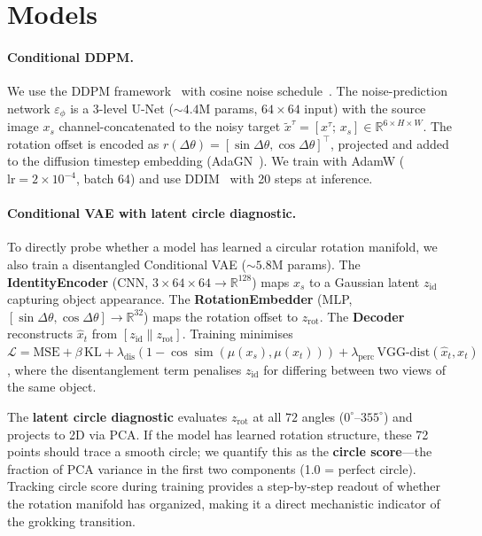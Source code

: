 \documentclass[11pt]{article}
\newcommand{\R}{\mathbb{R}}
\newcommand{\Dtheta}{\Delta\theta}
\newcommand{\eps}{\varepsilon}
\begin{document}
\section{Models}
\label{sec:models}

\paragraph{Conditional DDPM.}
We use the DDPM framework~\cite{ho2020ddpm} with cosine noise
schedule~\cite{nichol2021improved}.  The noise-prediction network $\eps_\phi$
is a 3-level U-Net (${\sim}4.4$M params, $64\times64$ input) with the source
image $x_s$ channel-concatenated to the noisy target
$\tilde{x}^\tau = [x^\tau;\, x_s] \in \R^{6\times H\times W}$.  The rotation
offset is encoded as $r(\Dtheta) = [\sin\Dtheta, \cos\Dtheta]^\top$, projected
and added to the diffusion timestep embedding (AdaGN~\cite{dhariwal2021beats}).
We train with AdamW ($\mathrm{lr}=2\!\times\!10^{-4}$, batch 64) and
use DDIM~\cite{song2021ddim} with 20 steps at inference.

\paragraph{Conditional VAE with latent circle diagnostic.}
To directly probe whether a model has learned a circular rotation manifold, we
also train a disentangled Conditional VAE (${\sim}5.8$M params).
The \textbf{IdentityEncoder} (CNN, $3\times64\times64 \to \mathbb{R}^{128}$)
maps $x_s$ to a Gaussian latent $z_\mathrm{id}$ capturing object appearance.
The \textbf{RotationEmbedder} (MLP, $[\sin\Dtheta, \cos\Dtheta] \to
\mathbb{R}^{32}$) maps the rotation offset to $z_\mathrm{rot}$.  The
\textbf{Decoder} reconstructs $\hat{x}_t$ from $[z_\mathrm{id} \| z_\mathrm{rot}]$.
Training minimises $\mathcal{L} = \mathrm{MSE} + \beta\,\mathrm{KL} +
\lambda_\mathrm{dis}(1 - \cos\!\operatorname{sim}(\mu(x_s), \mu(x_t))) +
\lambda_\mathrm{perc}\,\mathrm{VGG\text{-}dist}(\hat{x}_t, x_t)$, where the
disentanglement term penalises $z_\mathrm{id}$ for differing between two views of
the same object.

The \textbf{latent circle diagnostic} evaluates $z_\mathrm{rot}$ at all $72$
angles ($0^{\circ}$--$355^{\circ}$) and projects to 2D via PCA.  If the model
has learned rotation structure, these 72 points should trace a smooth circle;
we quantify this as the \textbf{circle score}---the fraction of PCA variance in
the first two components (1.0 = perfect circle).  Tracking circle score during
training provides a step-by-step readout of whether the rotation manifold has
organized, making it a direct mechanistic indicator of the grokking transition.
\end{document}
